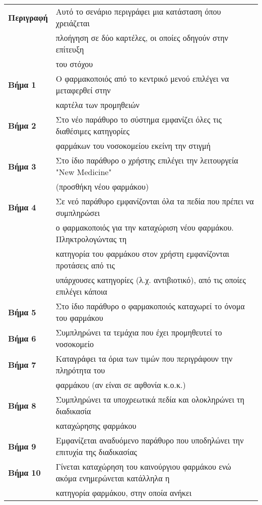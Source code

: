 \documentclass{article}
\newcommand\T{\rule{0pt}{2.6ex}}       %
\newcommand\B{\rule[-1.2ex]{0pt}{0pt}}
\begin{document}
 \begin{center}
     \begin{tabular}{|l|l|}
     \hline
      \textbf{Περιγραφή} & Αυτό το σενάριο περιγράφει μια κατάσταση όπου χρειάζεται \T \\& πλοήγηση σε δύο καρτέλες, οι οποίες οδηγούν στην επίτευξη \\& του στόχου \B \\ 
      \hline
      \textbf{Βήμα 1} & Ο φαρμακοποιός από το κεντρικό μενού επιλέγει να μεταφερθεί στην \T \\& καρτέλα των προμηθειών \B \\
      \hline
      \textbf{Βήμα 2} & Στο νέο παράθυρο το σύστημα εμφανίζει όλες τις διαθέσιμες κατηγορίες \T \\& φαρμάκων του νοσοκομείου εκείνη την στιγμή \B \\
      \hline
      \textbf{Βήμα 3} & Στο ίδιο παράθυρο ο χρήστης επιλέγει την λειτουργεία "New Medicine" \T \\& (προσθήκη νέου φαρμάκου) \B \\
      \hline
      \textbf{Βήμα 4} & Σε νεό παράθυρο εμφανίζονται όλα τα πεδία που πρέπει να συμπληρώσει \T \\&  ο φαρμακοποιός για την καταχώριση νέου φαρμάκου. Πληκτρολογώντας τη \\& κατηγορία του φαρμάκου στον χρήστη εμφανίζονται προτάσεις από τις \\& υπάρχουσες κατηγορίες  (λ.χ. αντιβιοτικό), από τις οποίες επιλέγει κάποια \B \\
      \hline
      \textbf{Βήμα 5} & Στο ίδιο παράθυρο ο φαρμακοποιός καταχωρεί το όνομα του φαρμάκου \T\B \\
      \hline
      \textbf{Βήμα 6} &  Συμπληρώνει τα τεμάχια που έχει προμηθευτεί το νοσοκομείο \T\B \\
      \hline
      \textbf{Βήμα 7} & Καταγράφει τα όρια των τιμών που περιγράφουν την πληρότητα του \T \\& φαρμάκου (αν είναι σε αφθονία κ.ο.κ.)\B \\
      \hline
      \textbf{Βήμα 8} & Συμπληρώνει τα υποχρεωτικά πεδία και ολοκληρώνει τη διαδικασία \T \\& καταχώρησης φαρμάκου \B \\
      \hline
      \textbf{Βήμα 9} & Εμφανίζεται αναδυόμενο παράθυρο που υποδηλώνει την επιτυχία της διαδικασίας \T\B \\
      \hline    
      \textbf{Βήμα 10} & Γίνεται καταχώρηση του καινούργιου φαρμάκου ενώ ακόμα ενημερώνεται κατάλληλα η \T \\& κατηγορία φαρμάκου, στην οποία ανήκει \B \\
      \hline
     \end{tabular}
 \end{center}
 
\end{document}
